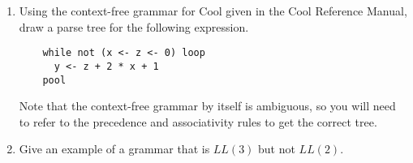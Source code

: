 \documentclass[12pt]{article}
\begin{document}
\begin{enumerate}
\item Using the context-free grammar for Cool given in the Cool Reference
Manual, draw a parse tree for the following expression.

\begin{verbatim}
    while not (x <- z <- 0) loop 
      y <- z + 2 * x + 1 
    pool  
\end{verbatim}

Note that the context-free grammar by itself is ambiguous, so you will
need to refer to the precedence and associativity rules to get
the correct tree. 

\item Give an example of a grammar that is $LL(3)$ but not $LL(2)$.

\end{enumerate}
\end{document}
